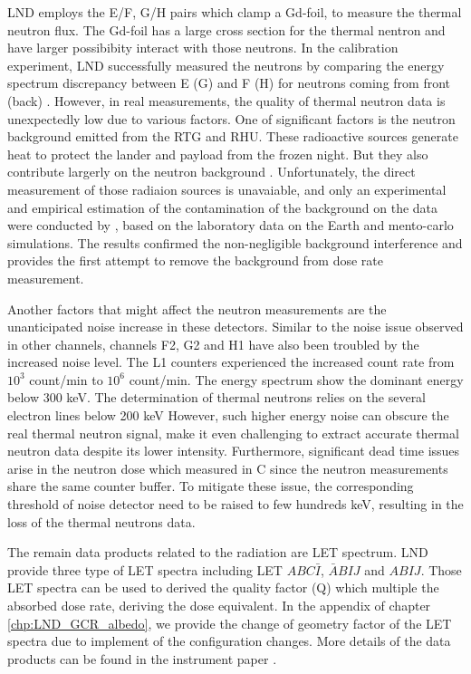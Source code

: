 \ac{LND} employs the E/F, G/H pairs which clamp a Gd-foil, to measure the thermal neutron flux. The Gd-foil has a large cross section for the thermal nentron and have larger possibibity interact with those neutrons. In the calibration experiment, \ac{LND} successfully measured the neutrons by comparing the energy spectrum discrepancy between E (G) and F (H) for neutrons coming from front (back) \citet{Wimmer2020SSRv}.
However, in real measurements, the quality of thermal neutron data is unexpectedly low due to various factors. One of significant factors is the neutron background emitted from the \ac{RTG} and \ac{RHU}. These radioactive sources generate heat to protect the lander and payload from the frozen night. But they also contribute largerly on the neutron background \citep{Zhang2020SciAdv}. Unfortunately, the direct measurement of those radiaion sources is unavaiable, and only an experimental and empirical estimation of the contamination of the background on the data were conducted by \citep{Hou2020-LNDbackground}, based on the laboratory data on the Earth and mento-carlo simulations. The results confirmed the non-negligible background interference and provides the first attempt to remove the background from dose rate measurement. 

Another factors that might affect the neutron measurements are the unanticipated noise increase in these detectors. Similar to the noise issue observed in other channels, channels F2, G2 and H1 have also been troubled by the increased noise level. The L1 counters experienced the increased count rate from $10^3$ count/min to $10^6$ count/min. The energy spectrum show the dominant energy below 300 keV. 
The determination of thermal neutrons relies on the several electron lines below 200 keV
However, such higher energy noise can obscure the real thermal neutron signal, make it even challenging to extract accurate thermal neutron data despite its lower intensity.
Furthermore, significant dead time issues arise in the neutron dose which measured in C since the neutron measurements share the same counter buffer. To mitigate these issue, the corresponding threshold of noise detector need to be raised to few hundreds keV, resulting in the loss of the thermal neutrons data.

The remain data products related to the radiation are \ac{LET} spectrum. \ac{LND} provide three type of \ac{LET} spectra including \ac{LET} $ABC\bar{I}$, $\bar{A}BIJ$ and $ABIJ$. Those \ac{LET} spectra can be used to derived the quality factor (Q) which multiple the absorbed dose rate, deriving the dose equivalent.
In the appendix of chapter \ref{chp:LND_GCR_albedo}, we provide the change of geometry factor of the LET spectra due to implement of the configuration changes.
More details of the data products can be found in the instrument paper \citet{Wimmer2020SSRv}.

